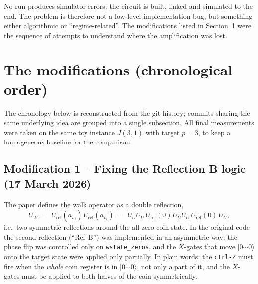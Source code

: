 \documentclass[11pt,a4paper]{article}
\begin{document}
No run produces simulator errors: the circuit is built, linked and
simulated to the end. The problem is therefore not a low-level
implementation bug, but something either algorithmic or ``regime-related''.
The modifications listed in Section~\ref{sec:mod} were the sequence of
attempts to understand where the amplification was lost.

\section{The modifications (chronological order)}
\label{sec:mod}

The chronology below is reconstructed from the git history;
commits sharing the same underlying idea are grouped into a single
subsection. All final measurements were taken on the same
toy instance $J(3,1)$ with target $p{=}3$, to keep a homogeneous
baseline for the comparison.


\subsection*{Modification 1 -- Fixing the Reflection B logic
(17 March 2026)}

The paper defines the walk operator as a double reflection,
\[
U_W \;=\; U_{\mathrm{ref}}(a_{v_j})\,U_{\mathrm{ref}}(a_{v_i})
\;=\; U_U U_U\,U_{\mathrm{ref}}(0)\,U_U U_U\,U_{\mathrm{ref}}(0)\,U_U,
\]
i.e.\ two symmetric reflections around the all-zero coin state. In the
original code the second reflection (``Ref~B'') was implemented in an
asymmetric way: the phase flip was controlled only on
\texttt{wstate\_zeros}, and the $X$-gates that move $|0\cdots0\rangle$
onto the target state were applied only partially. In plain words: the
\texttt{ctrl-Z} must fire when the \emph{whole} coin register is in
$|0\cdots0\rangle$, not only a part of it, and the $X$-gates must be
applied to both halves of the coin symmetrically.
\end{document}
